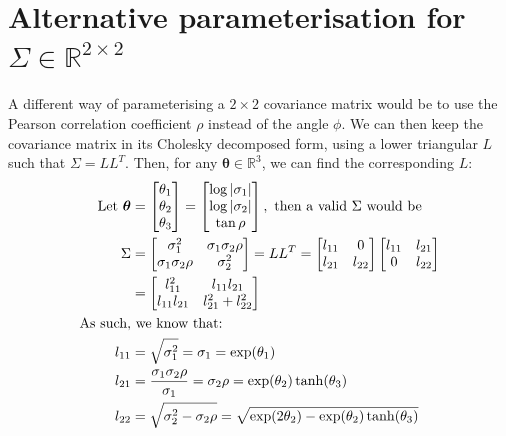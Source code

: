 \documentclass[a4paper, 12pt]{report}
\begin{document}
\section{Alternative parameterisation for $\Sigma \in \mathbb{R}^{2\times 2}$}
\label{sec:pearson}
A different way of parameterising a $2\times 2$ covariance matrix would be to use the Pearson correlation coefficient $\rho$ instead of the angle $\phi$. 
We can then keep the covariance matrix in its Cholesky decomposed form, using a lower triangular $L$ such that $\Sigma=LL^T$. Then, for any $\boldsymbol{\theta}\in\mathbb{R}^3$, we can find the corresponding $L$:
\begin{align}
\textrm{Let }\boldsymbol{\theta}&=\begin{bmatrix}
	\theta_1\\
	\theta_2\\
	\theta_3\\
\end{bmatrix}=\begin{bmatrix}
	\log|\sigma_1| \\
	\log|\sigma_2|\\
	\tan\rho\\
\end{bmatrix}, \textrm{ then a valid $\Sigma$ would be} \\
	\Sigma &= \begin{bmatrix}
 \sigma_1^2 & \sigma_1\sigma_2\rho \\
  \sigma_1\sigma_2\rho & \sigma_2^2 \\
\end{bmatrix}
= LL^T = \begin{bmatrix}
 l_{11} & 0 \\
  l_{21} & l_{22} \\
\end{bmatrix}\begin{bmatrix}
 l_{11} & l_{21} \\
  0 & l_{22} \\
\end{bmatrix}\\
&=\begin{bmatrix}
 l_{11}^2 & l_{11}l_{21} \\
  l_{11}l_{21} & l_{21}^2 + l_{22}^2 \\
\end{bmatrix}\hspace{0.5cm}\\
\textrm{As such,}&\textrm{ we know that:}\nonumber\\
	l_{11} &= \sqrt{\sigma_1^2} =\sigma_1=\exp(\theta_1)\\
	l_{21} &= \frac{\sigma_1\sigma_2\rho}{\sigma_1}=\sigma_2\rho=\exp(\theta_2)\tanh(\theta_3) \\
	l_{22} &= \sqrt{\sigma_2^2 - \sigma_2\rho} = \sqrt{\exp(2\theta_2)-\exp(\theta_2)\tanh(\theta_3)}
\end{align}
\end{document}
